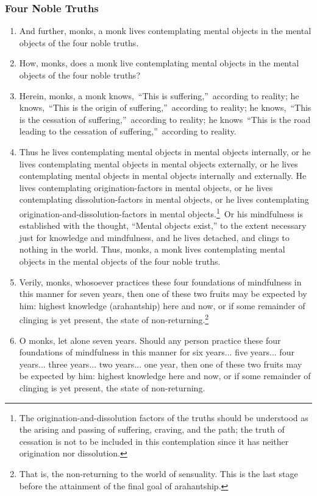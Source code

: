 \documentclass[a4 paper, 12pt]{article}
\begin{document}
\begin{multicols}{2}
\subsubsection*{Four Noble Truths}
\begin{enumerate}[resume]
\item And further, monks, a monk lives contemplating mental objects in the mental objects of the four noble truths.
\item How, monks, does a monk live contemplating mental objects in the mental objects of the four noble truths?
\item Herein, monks, a monk knows, “This is suffering,” according to reality; he knows, “This is the origin of suffering,” according to reality; he knows, “This is the cessation of suffering,” according to reality; he knows “This is the road leading to the cessation of suffering,” according to reality.
\item Thus he lives contemplating mental objects in mental objects internally, or he lives contemplating mental objects in mental objects externally, or he lives contemplating mental objects in mental objects internally and externally. He lives contemplating origination-factors in mental objects, or he lives contemplating dissolution-factors in mental objects, or he lives contemplating origination-and-dissolution-factors in mental objects.\footnote{The origination-and-dissolution factors of the truths should be understood as the arising and passing of suffering, craving, and the path; the truth of cessation is not to be included in this contemplation since it has neither origination nor dissolution.} Or his mindfulness is established with the thought, “Mental objects exist,” to the extent necessary just for knowledge and mindfulness, and he lives detached, and clings to nothing in the world. Thus, monks, a monk lives contemplating mental objects in the mental objects of the four noble truths.
\item Verily, monks, whosoever practices these four foundations of mindfulness in this manner for seven years, then one of these two fruits may be expected by him: highest knowledge (arahantship) here and now, or if some remainder of clinging is yet present, the state of non-returning.\footnote{That is, the non-returning to the world of sensuality. This is the last stage before the attainment of the final goal of arahantship.}
\item O monks, let alone seven years. Should any person practice these four foundations of mindfulness in this manner for six years... five years... four years... three years... two years... one year, then one of these two fruits may be expected by him: highest knowledge here and now, or if some remainder of clinging is yet present, the state of non-returning.

\end{enumerate}
\end{multicols}
\end{document}
